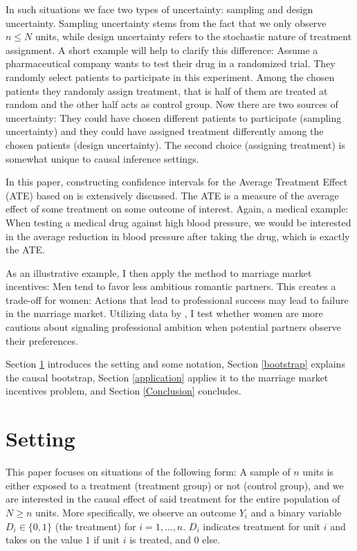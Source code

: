 \documentclass[aodsor,preprint]{imsart}
\numberwithin{equation}{section}
\theoremstyle{plain}
\begin{document}
In such situations we face two types of uncertainty: sampling and design uncertainty. Sampling uncertainty stems from the fact that we only observe $n \leq N$ units, while design uncertainty refers to the stochastic nature of treatment assignment. A short example will help to clarify this difference: Assume a pharmaceutical company wants to test their drug in a randomized trial. They randomly select patients to participate in this experiment. Among the chosen patients they randomly assign treatment, that is half of them are treated at random and the other half acts as control group. Now there are two sources of uncertainty: They could have chosen different patients to participate (sampling uncertainty) and they could have assigned treatment differently among the chosen patients (design uncertainty). The second choice (assigning treatment) is somewhat unique to causal inference settings.

In this paper, constructing confidence intervals for the Average Treatment Effect (ATE) based on \cite{Imbens_2021} is extensively discussed. The ATE is a measure of the average effect of some treatment on some outcome of interest. Again, a medical example: When testing a medical drug against high blood pressure, we would be interested in the average reduction in blood pressure after taking the drug, which is exactly the ATE.

As an illustrative example, I then apply the method to marriage market incentives: Men tend to favor less ambitious romantic partners. This creates a trade-off for women: Actions that lead to professional success may lead to failure in the marriage market. Utilizing data by \cite{Bursztyn_2017}, I test whether women are more cautious about signaling professional ambition when potential partners observe their preferences.

Section \ref{setting} introduces the setting and some notation, Section \ref{bootstrap} explains the causal bootstrap, Section \ref{application} applies it to the marriage market incentives problem, and Section \ref{Conclusion} concludes.



\section{Setting} \label{setting}

This paper focuses on situations of the following form: A sample of $n$ units is either exposed to a treatment (treatment group) or not (control group), and we are interested in the causal effect of said treatment for the entire population of $N \geq n$ units. More specifically, we observe an outcome $Y_i$ and a binary variable $D_i \in \{0, 1\}$ (the treatment) for $i = 1,\ldots, n$. $D_i$ indicates treatment for unit $i$ and takes on the value $1$ if unit $i$ is treated, and $0$ else.
\end{document}
